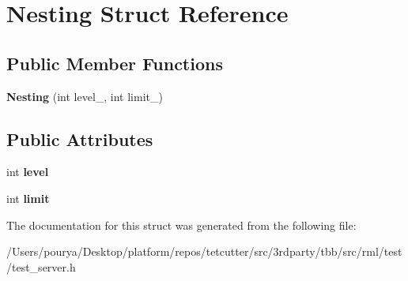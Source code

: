 \hypertarget{structNesting}{}\section{Nesting Struct Reference}
\label{structNesting}
\subsection*{Public Member Functions}
\begin{DoxyCompactItemize}
\item 
\hypertarget{structNesting_aeedf090c681d1a89f509023940b167f1}{}{\bfseries Nesting} (int level\+\_\+, int limit\+\_\+)\label{structNesting_aeedf090c681d1a89f509023940b167f1}

\end{DoxyCompactItemize}
\subsection*{Public Attributes}
\begin{DoxyCompactItemize}
\item 
\hypertarget{structNesting_ad83425c9b4b63962c111f9186c4d277c}{}int {\bfseries level}\label{structNesting_ad83425c9b4b63962c111f9186c4d277c}

\item 
\hypertarget{structNesting_ad89a95ea7e97d32f71e6b7ea3c44d97f}{}int {\bfseries limit}\label{structNesting_ad89a95ea7e97d32f71e6b7ea3c44d97f}

\end{DoxyCompactItemize}


The documentation for this struct was generated from the following file\+:\begin{DoxyCompactItemize}
\item 
/\+Users/pourya/\+Desktop/platform/repos/tetcutter/src/3rdparty/tbb/src/rml/test/test\+\_\+server.\+h\end{DoxyCompactItemize}
